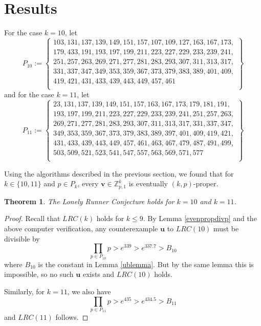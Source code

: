 \documentclass[11pt]{amsart}
\newcommand{\set}[1]{\left\{#1\right\}}
\newcommand{\Int}[1]{\mathbb Z_{#1}}
\newcommand{\vbf}{\mathbf{v}}
\newcommand{\ubf}{\mathbf{u}}
\newtheorem{theorem}{Theorem}[section]
\theoremstyle{definition}
\theoremstyle{remark}
\begin{document}
\section{Results}
\label{sec:result}
For the case $k=10$, let \[ P_{10} := \set{ \begin{aligned} 
    103, 131, 137, 139, 149, 151, 157, 107, 109, 127, 163, 167, 173, \\
    179, 433, 191, 193, 197, 199, 211, 223, 227, 229, 233, 239, 241, \\
    251, 257, 263, 269, 271, 277, 281, 283, 293, 307, 311, 313, 317, \\ 
    331, 337, 347, 349, 353, 359, 367, 373, 379, 383, 389, 401, 409, \\
    419, 421, 431, 433, 439, 443, 449, 457, 461 \\
    \end{aligned}
  } \]
and for the case $k=11$, let \[ P_{11} := \set{ \begin{aligned} 
      23, 131, 137, 139, 149, 151, 157, 163, 167, 173, 179, 181, 191, \\ 
      193, 197, 199, 211, 223, 227, 229, 233, 239, 241, 251, 257, 263, \\
      269, 271, 277, 281, 283, 293, 307, 311, 313, 317, 331, 337, 347, \\
      349, 353, 359, 367, 373, 379, 383, 389, 397, 401, 409, 419, 421, \\
      431, 433, 439, 443, 449, 457, 461, 463, 467, 479, 487, 491, 499, \\ 
      503, 509, 521, 523, 541, 547, 557, 563, 569, 571, 577 \\
    \end{aligned}
  } \]

Using the algorithms described in the previous section, we found that for $k\in\{10,11\}$ and $p\in P_k$, 
every $\vbf\in\Int{p,1}^k$ is eventually $(k,p)$-proper. 

\begin{theorem}
  The Lonely Runner Conjecture holds for $k=10$ and $k=11$.
\end{theorem}
\begin{proof}
  Recall that $LRC(k)$ holds for $k\leq 9$. By Lemma \ref{evenpropdivp} and the above computer verification, 
  any counterexample $\ubf$ to $LRC(10)$ must be divisible by \[\prod_{p \in P_{10}} p > e^{339} > e^{337.7} > B_{10}\] 
  where $B_{10}$ is the constant in Lemma \ref{ublemma}.
  But by the same lemma this is impossible, so no such $\ubf$ exists and $LRC(10)$ holds. 

  Similarly, for $k=11$, we also have
  \[ \prod_{p \in P_{11}} p > e^{435} > e^{434.5} > B_{11} \]
  and $LRC(11)$ follows.
\end{proof}
\end{document}
